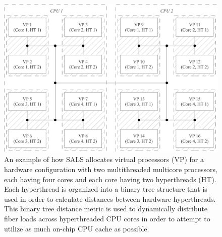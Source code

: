 \begin{figure}
\centering
\includegraphics[width=12cm]{gfx/cpu_core_hyperthread_distances}
\caption[An example of how SALS allocates virtual processors for a
  hardware configuration with two multithreaded multicore
  processors.]{An example of how SALS allocates virtual processors
  (VP) for a hardware configuration with two multithreaded multicore
  processors, each having four cores and each core having two
  hyperthreads (HT).  Each hyperthread is organized into a binary tree
  structure that is used in order to calculate distances between
  hardware hyperthreads.  This binary tree distance metric is used to
  dynamically distribute fiber loads across hyperthreaded CPU cores in
  order to attempt to utilize as much on-chip CPU cache as possible.}
\label{figure:cpu_core_hyperthread_distances}
\end{figure}

